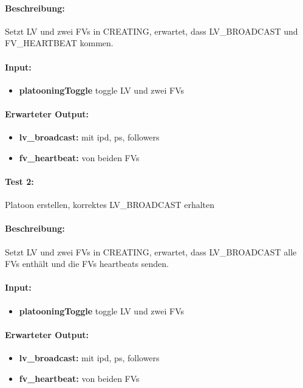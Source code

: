 \documentclass[a4paper, 12pt, titlepage]{scrartcl}
\begin{document}
{			\paragraph{Beschreibung:} Setzt LV und zwei FVs in CREATING, erwartet, dass LV\_BROADCAST und FV\_HEARTBEAT kommen.
			\paragraph{Input:}
			\begin{itemize} \itemsep-0.5em
				\item \textbf{platooningToggle} toggle LV und zwei FVs
			\end{itemize}

			\paragraph{Erwarteter Output:}
			\begin{itemize} \itemsep-0.5em
				\item \textbf{lv\_broadcast:} mit ipd, ps, followers
				\item \textbf{fv\_heartbeat:} von beiden FVs
			\end{itemize}

			\paragraph{Test 2:}{Platoon erstellen, korrektes LV\_BROADCAST erhalten}
			\paragraph{Beschreibung:} Setzt LV und zwei FVs in CREATING, erwartet, dass LV\_BROADCAST alle FVs enthält und die FVs heartbeats senden.
			\paragraph{Input:}
			\begin{itemize} \itemsep-0.5em
				\item \textbf{platooningToggle} toggle LV und zwei FVs
			\end{itemize}

			\paragraph{Erwarteter Output:}
			\begin{itemize} \itemsep-0.5em
				\item \textbf{lv\_broadcast:} mit ipd, ps, followers
				\item \textbf{fv\_heartbeat:} von beiden FVs
			\end{itemize}

}
\end{document}
